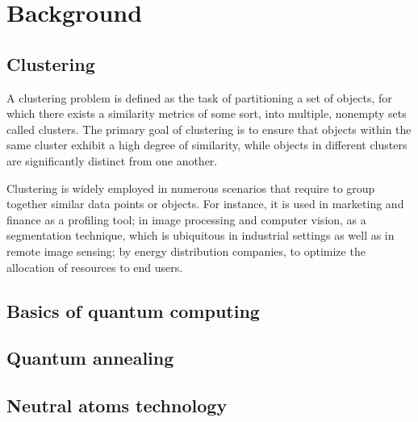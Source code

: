 \chapter{Background}
\label{cha:background}

\section{Clustering}
A clustering problem is defined as the task of partitioning a set of objects, for which there exists a similarity metrics of some sort, into multiple, nonempty sets called clusters. The primary goal of clustering is to ensure that objects within the same cluster exhibit a high degree of similarity, while objects in different clusters are significantly distinct from one another.

Clustering is widely employed in numerous scenarios that require to group together similar data points or objects. For instance, it is used in marketing and finance as a profiling tool; %
in image processing and computer vision, as a segmentation technique, which is ubiquitous in industrial settings as well as in remote image sensing; %
by energy distribution companies, to optimize the allocation of resources to end users. %

\section{Basics of quantum computing}

\section{Quantum annealing}

\section{Neutral atoms technology}